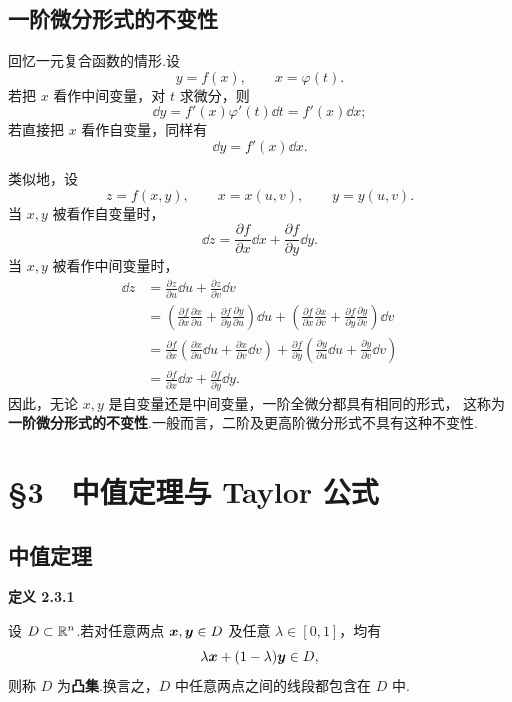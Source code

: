 \subsection*{一阶微分形式的不变性}

回忆一元复合函数的情形.设
\[
y=f(x),\qquad x=\varphi(t).
\]
若把 $x$ 看作中间变量，对 $t$ 求微分，则
\[
\dd y=f'(x)\varphi'(t)\dd t=f'(x)\dd x;
\]
若直接把 $x$ 看作自变量，同样有
\[
\dd y=f'(x)\dd x.
\]

类似地，设
\[
z=f(x,y),
\qquad
x=x(u,v),
\qquad
y=y(u,v).
\]
当 $x,y$ 被看作自变量时，
\[
\dd z=\frac{\partial f}{\partial x}\dd x
+\frac{\partial f}{\partial y}\dd y.
\]
当 $x,y$ 被看作中间变量时，
\[
\begin{aligned}
\dd z
&=
\frac{\partial z}{\partial u}\dd u
+
\frac{\partial z}{\partial v}\dd v\\
&=
\left(
\frac{\partial f}{\partial x}\frac{\partial x}{\partial u}
+
\frac{\partial f}{\partial y}\frac{\partial y}{\partial u}
\right)\dd u
+
\left(
\frac{\partial f}{\partial x}\frac{\partial x}{\partial v}
+
\frac{\partial f}{\partial y}\frac{\partial y}{\partial v}
\right)\dd v\\
&=
\frac{\partial f}{\partial x}
\left(
\frac{\partial x}{\partial u}\dd u
+
\frac{\partial x}{\partial v}\dd v
\right)
+
\frac{\partial f}{\partial y}
\left(
\frac{\partial y}{\partial u}\dd u
+
\frac{\partial y}{\partial v}\dd v
\right)\\
&=
\frac{\partial f}{\partial x}\dd x
+
\frac{\partial f}{\partial y}\dd y.
\end{aligned}
\]
因此，无论 $x,y$ 是自变量还是中间变量，一阶全微分都具有相同的形式，
这称为\textbf{一阶微分形式的不变性}.一般而言，二阶及更高阶微分形式不具有这种不变性.







\section*{§3　中值定理与 Taylor 公式}

\subsection*{中值定理}



\textbf{定义 2.3.1}

设 $D\subset\mathbb{R}^n$.若对任意两点 $\boldsymbol{x},\boldsymbol{y}\in D$ 及任意
	$\lambda\in[0,1]$，均有
	\[
	\lambda\boldsymbol{x}+(1-\lambda)\boldsymbol{y}\in D,
	\]
	则称 $D$ 为\textbf{凸集}.换言之，$D$ 中任意两点之间的线段都包含在 $D$ 中.






